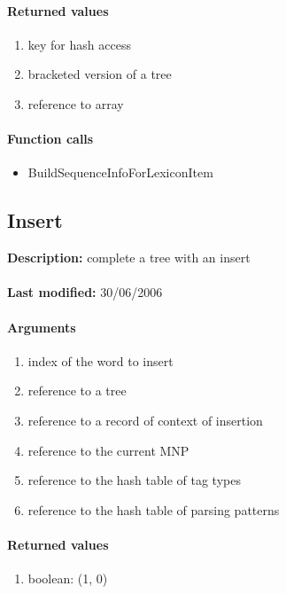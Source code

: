 \paragraph{Returned values}
\begin{enumerate}
\item key for hash access
\item bracketed version of a tree
\item reference to array
\end{enumerate}

\paragraph{Function calls}
\begin{itemize}
\item BuildSequenceInfoForLexiconItem
\end{itemize}

\subsection{Insert}
\textbf{Description:} complete a tree with an insert\\
\\\textbf{Last modified:} 30/06/2006

\paragraph{Arguments}
\begin{enumerate}
\item index of the word to insert
\item reference to a tree
\item reference to a record of context of insertion
\item reference to the current MNP
\item reference to the hash table of tag types
\item reference to the hash table of parsing patterns
\end{enumerate}

\paragraph{Returned values}
\begin{enumerate}
\item boolean: (1, 0)
\end{enumerate}

